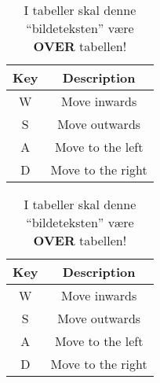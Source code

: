 \documentclass{article}
\begin{document}
\begin{table}[H]
    \caption{I tabeller skal denne ``bildeteksten'' være \textbf{OVER} tabellen!}
    \label{tab:keybinds}
    \centering
    \begin{tabular}{cc}
        Key & Description \\
        \hline\hline
        W & Move inwards \\
        S & Move outwards \\
        A & Move to the left \\
        D & Move to the right \\\hline
    \end{tabular}
\end{table}
\begin{table}[H]
    \caption{I tabeller skal denne ``bildeteksten'' være \textbf{OVER} tabellen!}
    \label{tab:keybinds2}
    \centering
    \begin{tabular}{|c|c|}
        \hline
        Key & Description \\\hline
        W & Move inwards \\\hline
        S & Move outwards \\\hline
        A & Move to the left \\\hline
        D & Move to the right \\\hline
    \end{tabular}
\end{table}
\end{document}
